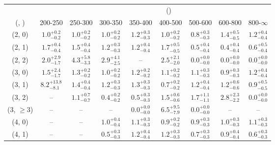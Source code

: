 \begin{table}[h!]
\tiny
\centering
{}
\begin{tabular}
{ccccccccc}
	\hline\hline
&	& \multicolumn{8}{c}{\scalht (\gev)} \\ 
	 (\njet,  \nb) & 200-250 & 250-300 & 300-350 & 350-400 & 400-500 & 500-600 & 600-800 & 800-$\infty$ \\ [0.8ex] 
\hline
	(2, 0) & $1.0^{+ 0.2 }_{- 0.2 }$ & $1.0^{+ 0.2 }_{- 0.2 }$ & $1.0^{+ 0.2 }_{- 0.2 }$ & $1.2^{+ 0.3 }_{- 0.3 }$ & $1.0^{+ 0.2 }_{- 0.2 }$ & $0.8^{+ 0.3 }_{- 0.3 }$ & $1.4^{+ 0.5 }_{- 0.5 }$ & $1.2^{+ 0.4 }_{- 0.4 }$ \\[0.5ex] 
	(2, 1) & $1.7^{+ 0.4 }_{- 0.4 }$ & $1.5^{+ 0.4 }_{- 0.4 }$ & $1.2^{+ 0.3 }_{- 0.3 }$ & $1.2^{+ 0.4 }_{- 0.4 }$ & $1.7^{+ 0.5 }_{- 0.5 }$ & $0.5^{+ 0.4 }_{- 0.4 }$ & $0.4^{+ 0.4 }_{- 0.4 }$ & $0.6^{+ 0.5 }_{- 0.4 }$ \\[0.5ex] 
	(2, 2) & $2.0^{+ 2.9 }_{- 1.7 }$ & $4.3^{+ 5.8 }_{- 3.3 }$ & $2.9^{+ 4.1 }_{- 2.5 }$ & -- & $2.5^{+ 2.1 }_{- 2.0 }$ & $0.0^{+ 0.0 }_{- 0.0 }$ & $0.0^{+ 0.0 }_{- 0.0 }$ & $0.0^{+ 0.0 }_{- 0.0 }$ \\[0.5ex] 
	(3, 0) & $1.5^{+ 2.4 }_{- 1.7 }$ & $1.3^{+ 0.2 }_{- 0.2 }$ & $1.0^{+ 0.2 }_{- 0.2 }$ & $1.2^{+ 0.2 }_{- 0.2 }$ & $1.1^{+ 0.2 }_{- 0.2 }$ & $1.1^{+ 0.3 }_{- 0.3 }$ & $0.9^{+ 0.3 }_{- 0.3 }$ & $1.2^{+ 0.4 }_{- 0.4 }$ \\[0.5ex] 
	(3, 1) & $8.2^{+ 13.8 }_{- 8.1 }$ & $1.4^{+ 0.4 }_{- 0.4 }$ & $1.2^{+ 0.3 }_{- 0.3 }$ & $1.3^{+ 0.3 }_{- 0.3 }$ & $0.7^{+ 0.2 }_{- 0.2 }$ & $1.2^{+ 0.4 }_{- 0.4 }$ & $1.2^{+ 0.6 }_{- 0.6 }$ & $0.9^{+ 0.5 }_{- 0.5 }$ \\[0.5ex] 
	(3, 2) & -- & $1.1^{+ 0.7 }_{- 0.7 }$ & $0.4^{+ 0.2 }_{- 0.2 }$ & $0.5^{+ 0.3 }_{- 0.3 }$ & $1.5^{+ 0.6 }_{- 0.6 }$ & $1.7^{+ 1.1 }_{- 1.1 }$ & $2.8^{+ 2.3 }_{- 2.2 }$ & $0.0^{+ 0.0 }_{- 0.0 }$ \\[0.5ex] 
	(3, $\ge3$) & -- & -- & -- & $0.0^{+ 0.0 }_{- 0.0 }$ & $6.5^{+ 9.5 }_{- 7.9 }$ & $0.0^{+ 0.0 }_{- 0.0 }$ & -- & -- \\[0.5ex] 
	(4, 0) & -- & -- & $1.0^{+ 0.4 }_{- 0.4 }$ & $1.1^{+ 0.3 }_{- 0.3 }$ & $0.9^{+ 0.2 }_{- 0.2 }$ & $0.9^{+ 0.3 }_{- 0.3 }$ & $1.0^{+ 0.3 }_{- 0.3 }$ & $1.1^{+ 0.3 }_{- 0.3 }$ \\[0.5ex] 
	(4, 1) & -- & -- & $0.5^{+ 0.3 }_{- 0.3 }$ & $1.2^{+ 0.4 }_{- 0.4 }$ & $1.2^{+ 0.3 }_{- 0.3 }$ & $0.7^{+ 0.3 }_{- 0.3 }$ & $0.9^{+ 0.4 }_{- 0.4 }$ & $0.6^{+ 0.3 }_{- 0.3 }$ \\[0.5ex] 

\end{tabular}
\end{table}
